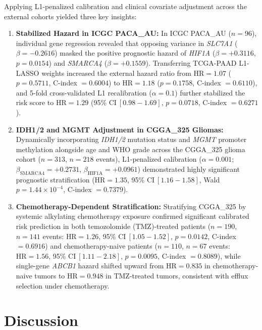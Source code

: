 \documentclass[11pt,a4paper]{article}
\begin{document}
Applying L1-penalized calibration and clinical covariate adjustment across the external cohorts yielded three key insights:
\begin{enumerate}
    \item \textbf{Stabilized Hazard in ICGC PACA\_AU:} In ICGC PACA\_AU ($n = 96$), individual gene regression revealed that opposing variance in \textit{SLC7A1} ($\beta = -0.2616$) masked the positive prognostic hazard of \textit{HIF1A} ($\beta = +0.3116$, $p = 0.0154$) and \textit{SMARCA4} ($\beta = +0.1559$). Transferring TCGA-PAAD L1-LASSO weights increased the external hazard ratio from $\text{HR} = 1.07$ ($p = 0.5711$, C-index $= 0.6004$) to $\text{HR} = 1.18$ ($p = 0.1758$, C-index $= 0.6110$), and 5-fold cross-validated L1 recalibration ($\alpha = 0.1$) further stabilized the risk score to $\text{HR} = 1.29$ (95\% $\text{CI}~[0.98 - 1.69]$, $p = 0.0718$, C-index $= 0.6271$).
    \item \textbf{IDH1/2 and MGMT Adjustment in CGGA\_325 Gliomas:} Dynamically incorporating \textit{IDH1/2} mutation status and \textit{MGMT} promoter methylation alongside age and WHO grade across the CGGA\_325 glioma cohort ($n = 313$, $n = 218$ events), L1-penalized calibration ($\alpha = 0.001$; $\beta_{\text{SMARCA4}} = +0.2731$, $\beta_{\text{HIF1A}} = +0.0961$) demonstrated highly significant prognostic stratification ($\text{HR} = 1.35$, 95\% $\text{CI}~[1.16 - 1.58]$, Wald $p = 1.44 \times 10^{-4}$, C-index $= 0.7379$).
    \item \textbf{Chemotherapy-Dependent Stratification:} Stratifying CGGA\_325 by systemic alkylating chemotherapy exposure confirmed significant calibrated risk prediction in both temozolomide (TMZ)-treated patients ($n = 190$, $n = 141$ events: $\text{HR} = 1.26$, 95\% $\text{CI}~[1.05 - 1.52]$, $p = 0.0142$, C-index $= 0.6916$) and chemotherapy-naive patients ($n = 110$, $n = 67$ events: $\text{HR} = 1.56$, 95\% $\text{CI}~[1.11 - 2.18]$, $p = 0.0095$, C-index $= 0.8089$), while single-gene \textit{ABCB1} hazard shifted upward from $\text{HR} = 0.835$ in chemotherapy-naive tumors to $\text{HR} = 0.948$ in TMZ-treated tumors, consistent with efflux selection under chemotherapy.
\end{enumerate}

\section{Discussion}
\end{document}
